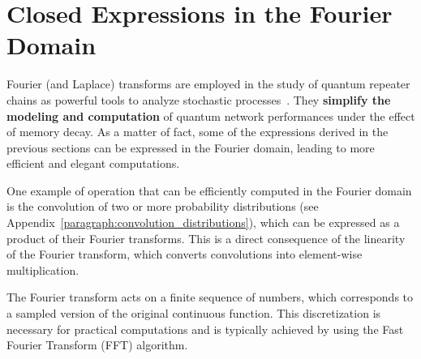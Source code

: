 \documentclass{masterthesis}
\begin{document}







\section{Closed Expressions in the Fourier Domain}

Fourier (and Laplace) transforms are employed in the study of quantum repeater chains as powerful tools to analyze stochastic processes~\cite{Kuzmin_2021}. They \textbf{simplify the modeling and computation} of quantum network performances under the effect of memory decay.
As a matter of fact, some of the expressions derived in the previous sections can be expressed in the Fourier domain, leading to more efficient and elegant computations.

One example of operation that can be efficiently computed in the Fourier domain is the convolution of two or more probability distributions (see Appendix~\ref{paragraph:convolution_distributions}), which can be expressed as a product of their Fourier transforms. This is a direct consequence of the linearity of the Fourier transform, which converts convolutions into element-wise multiplication.

The Fourier transform acts on a finite sequence of numbers, which corresponds to a sampled version of the original continuous function. This discretization is necessary for practical computations and is typically achieved by using the Fast Fourier Transform (FFT) algorithm. 
\end{document}
